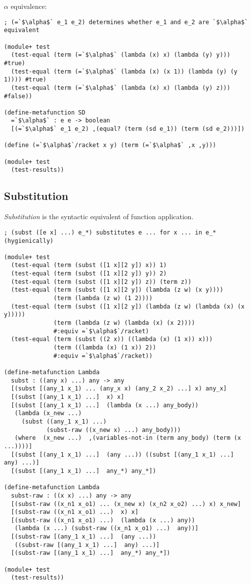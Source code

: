 $\alpha$ equivalence:

\begin{lstlisting}[frame=none,numbers=none]
; (=`$\alpha$` e_1 e_2) determines whether e_1 and e_2 are `$\alpha$` equivalent

(module+ test
  (test-equal (term (=`$\alpha$` (lambda (x) x) (lambda (y) y))) #true)
  (test-equal (term (=`$\alpha$` (lambda (x) (x 1)) (lambda (y) (y 1)))) #true)
  (test-equal (term (=`$\alpha$` (lambda (x) x) (lambda (y) z))) #false))

(define-metafunction SD
  =`$\alpha$` : e e -> boolean
  [(=`$\alpha$` e_1 e_2) ,(equal? (term (sd e_1)) (term (sd e_2)))])

(define (=`$\alpha$`/racket x y) (term (=`$\alpha$` ,x ,y)))

(module+ test
  (test-results))
\end{lstlisting}

\subsection{Substitution}

\textit{Substitution} is the syntactic equivalent of function application.

\begin{lstlisting}[frame=none,numbers=none]
; (subst ([e x] ...) e_*) substitutes e ... for x ... in e_* (hygienically)

(module+ test
  (test-equal (term (subst ([1 x][2 y]) x)) 1)
  (test-equal (term (subst ([1 x][2 y]) y)) 2)
  (test-equal (term (subst ([1 x][2 y]) z)) (term z))
  (test-equal (term (subst ([1 x][2 y]) (lambda (z w) (x y))))
              (term (lambda (z w) (1 2))))
  (test-equal (term (subst ([1 x][2 y]) (lambda (z w) (lambda (x) (x y)))))
              (term (lambda (z w) (lambda (x) (x 2))))
              #:equiv =`$\alpha$`/racket)
  (test-equal (term (subst ((2 x)) ((lambda (x) (1 x)) x)))
              (term ((lambda (x) (1 x)) 2))
              #:equiv =`$\alpha$`/racket))

(define-metafunction Lambda
  subst : ((any x) ...) any -> any
  [(subst [(any_1 x_1) ... (any_x x) (any_2 x_2) ...] x) any_x]
  [(subst [(any_1 x_1) ...]  x) x]
  [(subst [(any_1 x_1) ...]  (lambda (x ...) any_body))
   (lambda (x_new ...)
     (subst ((any_1 x_1) ...)
            (subst-raw ((x_new x) ...) any_body)))
   (where  (x_new ...)  ,(variables-not-in (term any_body) (term (x ...))))]
  [(subst [(any_1 x_1) ...]  (any ...)) ((subst [(any_1 x_1) ...]  any) ...)]
  [(subst [(any_1 x_1) ...]  any_*) any_*])

(define-metafunction Lambda
  subst-raw : ((x x) ...) any -> any
  [(subst-raw ((x_n1 x_o1) ... (x_new x) (x_n2 x_o2) ...) x) x_new]
  [(subst-raw ((x_n1 x_o1) ...)  x) x]
  [(subst-raw ((x_n1 x_o1) ...)  (lambda (x ...) any))
   (lambda (x ...) (subst-raw ((x_n1 x_o1) ...)  any))]
  [(subst-raw [(any_1 x_1) ...]  (any ...))
   ((subst-raw [(any_1 x_1) ...]  any) ...)]
  [(subst-raw [(any_1 x_1) ...]  any_*) any_*])

(module+ test
  (test-results))
\end{lstlisting}


